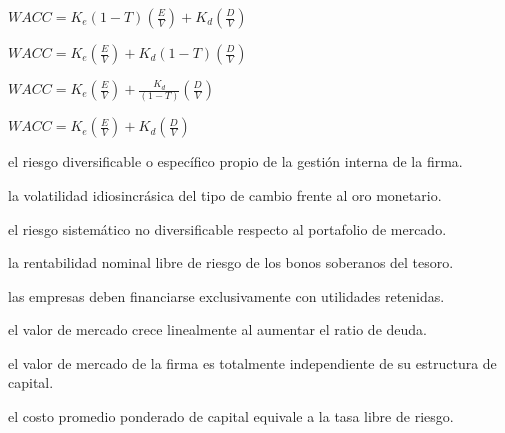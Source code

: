 \begin{opts}
    \item $WACC = K_e (1 - T) \left(\frac{E}{V}\right) + K_d \left(\frac{D}{V}\right)$
    \item $WACC = K_e \left(\frac{E}{V}\right) + K_d (1 - T) \left(\frac{D}{V}\right)$
    \item $WACC = K_e \left(\frac{E}{V}\right) + \frac{K_d}{(1 - T)} \left(\frac{D}{V}\right)$
    \item $WACC = K_e \left(\frac{E}{V}\right) + K_d \left(\frac{D}{V}\right)$
\end{opts}

\begin{opts}
    \item el riesgo diversificable o específico propio de la gestión interna de la firma.
    \item la volatilidad idiosincrásica del tipo de cambio frente al oro monetario.
    \item el riesgo sistemático no diversificable respecto al portafolio de mercado.
    \item la rentabilidad nominal libre de riesgo de los bonos soberanos del tesoro.
\end{opts}

\begin{opts}
    \item las empresas deben financiarse exclusivamente con utilidades retenidas.
    \item el valor de mercado crece linealmente al aumentar el ratio de deuda.
    \item el valor de mercado de la firma es totalmente independiente de su estructura de capital.
    \item el costo promedio ponderado de capital equivale a la tasa libre de riesgo.
\end{opts}

